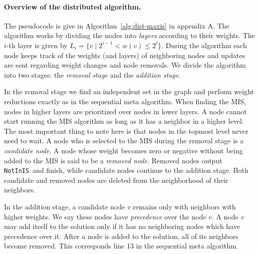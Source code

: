 \documentclass[11pt]{article}
\newcommand{\NotInIS}{\texttt{NotInIS}}
\begin{document}
\paragraph{Overview of the distributed algorithm.} The pseudocode is give in Algorithm~\ref{alg:dist-maxis} in appendix A. The algorithm works by dividing the nodes into \emph{layers} according to their weights. The $i$-th layer is given by $L_i = \{v \mid 2^{i-1}< w(v) \leq 2^i \}$. During the algorithm each node keeps track of the weights (and layers) of neighboring nodes and updates are sent regarding weight changes and node removals. We divide the algorithm into two stages: the \emph{removal stage} and the \emph{addition stage}.

In the removal stage we find an independent set in the graph and perform weight reductions exactly as in the sequential meta algorithm. When finding the MIS, nodes in higher layers are prioritized over nodes in lower layers. A node cannot start running the MIS algorithm as long as it has a neighbor in a higher level. The most important thing to note here is that nodes in the topmost level never need to wait. A node who is selected to the MIS during the removal stage is a \emph{candidate node}. A node whose weight becomes zero or negative without being added to the MIS is said to be a \emph{removed node}. Removed nodes output \NotInIS~and finish, while candidate nodes continue to the addition stage. Both candidate and removed nodes are deleted from the neighborhood of their neighbors.
\par
In the addition stage, a candidate node $v$ remains only with neighbors with higher weights. We say these nodes have \emph{precedence} over the node $v$. A node $v$ may add itself to the solution only if it has no neighboring nodes which have precedence over it. After a node is added to the solution, all of its neighbors become removed. This corresponds line 13 in the sequential meta algorithm.
\end{document}
